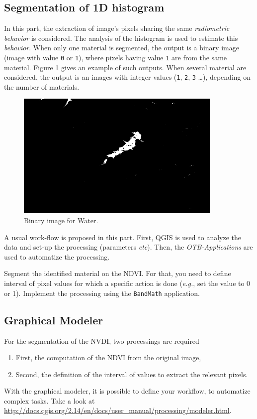 \documentclass[a4paper,11pt,DIV=18]{scrartcl}
\begin{document}
\subsection{Segmentation of 1D histogram}
\label{sec:orgda326a6}
In  this part,  the  extraction  of image's  pixels  sharing the  same
\emph{radiometric behavior} is considered.  The  analysis of the histogram is
used to estimate this \emph{behavior}.   When only one material is segmented,
the output is a  binary image (image with value \texttt{0}  or \texttt{1}), where pixels
having  value \texttt{1}  are from  the same  material.  Figure  \ref{fig:orgfaadec1}
gives  an  example  of  such   outputs.   When  several  material  are
considered, the output is an images with integer values (\texttt{1}, \texttt{2}, \texttt{3} \ldots{}),
depending on the number of materials.

\begin{figure}[htbp]
\centering
\includegraphics[width=0.65\linewidth]{./figures/quicklook_seg_eau.png}
\caption{\label{fig:orgfaadec1}
Binary image for Water.}
\end{figure}

A usual  work-flow is proposed  in this part.  First, QGIS is  used to
analyze the data and set-up the processing (parameters \emph{etc}). Then, the
\emph{OTB-Applications} are used to automatize the processing.

\begin{work}
Segment the  identified material on the  NDVI.  For that, you  need to
define interval  of pixel values for  which a specific action  is done
(\emph{e.g.}, set the  value to 0 or 1).  Implement  the processing using the
\texttt{BandMath} application.
\end{work}
\subsection{Graphical Modeler}
\label{sec:orga30f9ae}
For the segmentation of the NVDI, two processings are required
\begin{enumerate}
\item First, the computation of the NDVI from the original image,
\item Second,  the definition of  the interval  of values to  extract the
relevant pixels.
\end{enumerate}
With the graphical modeler, it is possible to define your workflow, to
automatize      complex      tasks.      Take      a      look      at
\url{http://docs.qgis.org/2.14/en/docs/user\_manual/processing/modeler.html}.  
\end{document}
